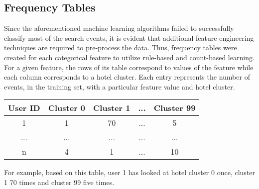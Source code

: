 \documentclass[12pt]{report}
\begin{document}
\subsection{Frequency Tables}
Since the aforementioned machine learning algorithms failed to successfully classify most of the search events, it is evident that additional feature engineering techniques are required to pre-process the data. Thus, frequency tables were created for each categorical feature to utilize rule-based and count-based learning. For a given feature, the rows of its table correspond to values of the feature while each column corresponds to a hotel cluster. Each entry represents the number of events, in the training set, with a particular feature value and hotel cluster.\\

\begin{center}
\begin{tabular}{|c|c|c|c|c|}
  \hline
 User ID& Cluster 0& Cluster 1& ...& Cluster 99 \\
  \hline \hline
 1  & 1 & 70& ...& 5 \\\hline
 ...  & ... & ...& ...& ... \\\hline
 n  & 4& 1& ...& 10 \\\hline
\end{tabular}
\end{center}

For example, based on this table, user 1 has looked at hotel cluster 0 once, cluster 1 70 times and cluster 99 five times.
\end{document}
